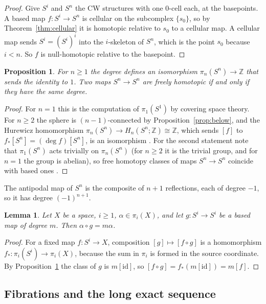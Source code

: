 \documentclass[11pt]{amsart}
\numberwithin{equation}{section}
\theoremstyle{plain}
\newtheorem{proposition}[theorem]{Proposition}
\newtheorem{lemma}[theorem]{Lemma}
\theoremstyle{definition}
\theoremstyle{remark}
\newcommand{\Z}{\mathbb{Z}}
\begin{document}
\begin{proof}
Give $S^i$ and $S^n$ the CW structures with one $0$-cell each, at the basepoints. A based map $f\colon S^i\to S^n$ is cellular on the subcomplex $\{s_0\}$, so by Theorem~\ref{thm:cellular} it is homotopic relative to $s_0$ to a cellular map. A cellular map sends $S^i=(S^i)^i$ into the $i$-skeleton of $S^n$, which is the point $s_0$ because $i<n$. So $f$ is null-homotopic relative to the basepoint.
\end{proof}

\begin{proposition}\label{prop:degree}
For $n\ge1$ the degree defines an isomorphism $\pi_n(S^n)\to\Z$ that sends the identity to $1$. Two maps $S^n\to S^n$ are freely homotopic if and only if they have the same degree.
\end{proposition}

\begin{proof}
For $n=1$ this is the computation of $\pi_1(S^1)$ by covering space theory. For $n\ge2$ the sphere is $(n-1)$-connected by Proposition~\ref{prop:below}, and the Hurewicz homomorphism $\pi_n(S^n)\to H_n(S^n;\Z)\cong\Z$, which sends $[f]$ to $f_*[S^n]=(\deg f)[S^n]$, is an isomorphism \cite[Theorem~4.32]{Hat02}. For the second statement note that $\pi_1(S^n)$ acts trivially on $\pi_n(S^n)$ (for $n\ge2$ it is the trivial group, and for $n=1$ the group is abelian), so free homotopy classes of maps $S^n\to S^n$ coincide with based ones \cite[Section~4.A]{Hat02}.
\end{proof}

The antipodal map of $S^n$ is the composite of $n+1$ reflections, each of degree $-1$, so it has degree $(-1)^{n+1}$.

\begin{lemma}\label{lem:precompose}
Let $X$ be a space, $i\ge1$, $\alpha\in\pi_i(X)$, and let $g\colon S^i\to S^i$ be a based map of degree $m$. Then $\alpha\circ g=m\alpha$.
\end{lemma}

\begin{proof}
For a fixed map $f\colon S^i\to X$, composition $[g]\mapsto[f\circ g]$ is a homomorphism $f_*\colon\pi_i(S^i)\to\pi_i(X)$, because the sum in $\pi_i$ is formed in the source coordinate. By Proposition~\ref{prop:degree} the class of $g$ is $m[\mathrm{id}]$, so $[f\circ g]=f_*(m[\mathrm{id}])=m[f]$.
\end{proof}

\subsection{Fibrations and the long exact sequence}
\end{document}

